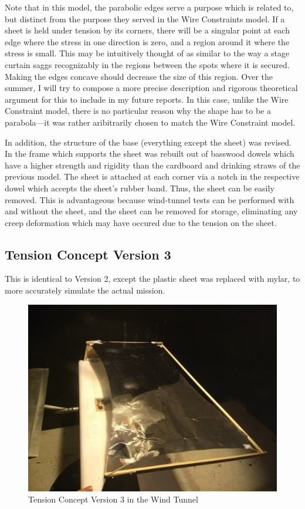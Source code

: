 \documentclass[12pt]{report} %
\begin{document}
Note that in this model, the parabolic edges serve a purpose which is related to, but distinct from the purpose they served in the Wire
Constraints model. If a sheet is held under tension by its corners, there will be a singular point at each edge where the stress in one
direction is zero, and a region around it where the stress is small. This may be intuitively thought of as similar to the way a stage
curtain saggs recognizably in the regions between the spots where it is secured. Making the edges concave should decrease the size of this
region. Over the summer, I will try to compose a more precise description and rigorous theoretical argument for this to include in my future
reports. In this case, unlike the Wire Constraint model, there is no particular reason why the shape has to be a parabola---it was rather
aribitrarily chosen to match the Wire Constraint model.

In addition, the structure of the base (everything except the sheet) was revised.  In the frame which supports the sheet was rebuilt out
of basswood dowels which have a higher strength and rigidity than the cardboard and drinking straws of the previous model.  The sheet is
attached at each corner via a notch in the respective dowel which accepts the sheet's rubber band.  Thus, the sheet can be easily removed.
 This is advantageous because wind-tunnel tests can be performed with and without the sheet, and the sheet can be removed for storage, eliminating
any creep deformation which may have occured due to the tension on the sheet.

\subsection{Tension Concept Version 3}
This is identical to Version 2, except the plastic sheet was replaced with mylar, to more accurately simulate the actual mission.
\begin{figure}
	\includegraphics[width = 0.6\linewidth]{with_mylar.jpg}
	\caption{Tension Concept Version 3 in the Wind Tunnel}
\end{figure}
\end{document}
